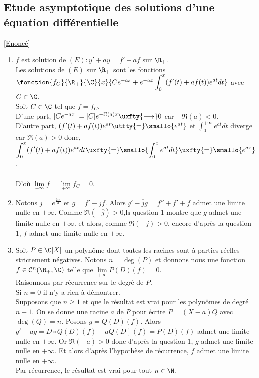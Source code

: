 \documentclass{book}
\begin{document}
	\subsection{Etude asymptotique des solutions d'une équation différentielle }
	\label{sec:etude-asymptotique-des-solutions-dune-equation-differentielle-etoile4}
	\textcolor{blue}{\hyperref[Etude asymptotique des solution d'une équation différentielle]{[Enoncé]}}\\
	\begin{enumerate}
		\item $f$ est solution de $(E) : y'+ay=f'+af$ sur $\R_+$.\\
		Les solutions de $(E)$ sur $\R_+$ sont les fonctions $\fonction{f_C}{\R_+}{\C}{x}{Ce^{-ax}+e^{-ax}\displaystyle\int_0^x(f'(t)+af(t))e^{at}dt}$ avec $C\in \C$.\\
		Soit $C\in \C$ tel que $f=f_C$.\\
		D'une part, $|Ce^{-ax}|=|C|e^{-\Re(a)x}\uxfty{\longrightarrow}0$ car $-\Re(a)<0$.\\
		D'autre part, $(f'(t)+af(t))e^{at}\utfty{=}\smallo{e^{at}}$ et $\displaystyle\int_0^{+\infty}e^{at}dt$ diverge car $\Re(a)>0$ donc,\\
		$\displaystyle\int_0^x(f'(t)+af(t))e^{at}dt\uxfty{=}\smallo{\displaystyle\int_0^xe^{at}dt}\uxfty{=}\smallo{e^{ax}}$.\\\\
		D'où $\lim\limits_{+\infty}f=\lim\limits_{+\infty}{f_C}=0$.
		\item Notons $j=e^{\frac{2i\pi}{3}}$ et $g=f'-jf$. Alors $g'-\overline{j}g=f''+f'+f$ admet une limite nulle en $+\infty$. Comme $\Re(-\overline{j})>0$,la question $1$ montre que $g$ admet une limite nulle en $+\infty$. et alors, comme $\Re(-j)>0$, encore d'après la question $1$, $f$ admet une limite nulle en $+\infty$.
		\item Soit $P\in \C[X]$ un polynôme dont toutes les racines sont à parties réelles strictement négatives. Notons $n=\deg(P)$ et donnons nous une fonction $f\in \mathcal{C}^n(\R_+,\C)$ telle que $\lim\limits_{+\infty}P(D)(f)=0$.\\
		Raisonnons par récurrence sur le degré de $P$.\\
		Si $n=0$ il n'y a rien à démontrer.\\
		Supposons que $n\geq 1$ et que le résultat est vrai pour les polynômes de degré $n-1$. On se donne une racine $a$ de $P$ pour écrire $P=(X-a)Q$ avec $\deg(Q)=n$. Posons $g=Q(D)(f)$. Alors $g'-ag=D\circ Q(D)(f)-aQ(D)(f)=P(D)(f)$ admet une limite nulle en $+\infty$. Or $\Re(-a)>0$ donc d'après la question $1$, $g$ admet une limite nulle en $+\infty$. Et alors d'après l'hypothèse de récurrence, $f$ admet une limite nulle en $+\infty$.\\
		Par récurrence, le résultat est vrai pour tout $n\in \N$.
	\end{enumerate}
	
\end{document}
